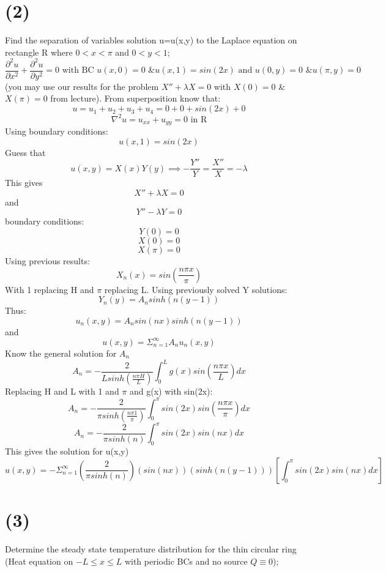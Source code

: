 \documentclass[preview,12pt]{article}
\begin{document}
\section*{(2)}
    Find the separation of variables solution u=u(x,y) to the Laplace equation on rectangle R where $0<x<\pi$ and $0<y<1$;
    $$\frac{\partial^2 u}{\partial x^2}+\frac{\partial^2u}{\partial y^2}=0 \textrm{ with BC } u(x,0)=0 \textrm{ \& } u(x,1)=sin(2x) \textrm{ and } u(0,y)=0 \textrm{ \& } u(\pi,y)=0$$
    (you may use our results for the problem $X''+\lambda X=0$ with $X(0)=0$ \& $X(\pi)=0$ from lecture).
    \newline
    From superposition know that:
    $$u=u_1+u_2+u_3+u_4=0+0+sin(2x)+0$$
    $$\nabla^2 u=u_{xx}+u_{yy}=0 \textrm{ in R}$$
    Using boundary conditions:
    $$u(x,1)=sin(2x)$$
    Guess that 
    $$u(x,y)=X(x)Y(y)\implies-\frac{Y''}{Y}=\frac{X''}{X}=-\lambda$$
    This gives
    $$X''+\lambda X=0$$
    and 
    $$Y''-\lambda Y=0$$
    boundary conditions:
    $$Y(0)=0$$
    $$X(0)=0$$
    $$X(\pi)=0$$
    Using previous results:
    $$X_n(x)=sin(\frac{n\pi x}{\pi})$$
    With 1 replacing H and $\pi$ replacing L. \newline
    Using previously solved Y solutions:
    $$Y_n(y)=A_nsinh(n(y-1))$$
    Thus: 
    $$u_n(x,y)=A_nsin(nx)sinh(n(y-1))$$
    and 
    $$u(x,y)=\Sigma^\infty_{n=1} A_n u_n(x,y)$$
    Know the general solution for $A_n$
    $$A_n=-\frac{2}{Lsinh(\frac{n\pi H}{L})}\int_0^Lg(x)sin(\frac{n\pi x}{L})dx$$
    Replacing H and L with 1 and $\pi$ and g(x) with sin(2x):
    $$A_n=-\frac{2}{\pi sinh(\frac{n\pi 1}{\pi})}\int_0^\pi sin(2x)sin(\frac{n\pi x}{\pi})dx$$
    $$A_n=-\frac{2}{\pi sinh(n)}\int_0^\pi sin(2x)sin(nx)dx$$
    This gives the solution for u(x,y)
    $$u(x,y)=-\Sigma^\infty_{n=1}\left(\frac{2}{\pi sinh(n)}\right)(sin(nx))(sinh(n(y-1)))\left[\int_0^\pi sin(2x)sin(nx)dx\right]$$
    
\section*{(3)}
    Determine the steady state temperature distribution for the thin circular ring (Heat equation on $-L\leq x \leq L$ with periodic BCs and no source $Q\equiv0$);
\end{document}
